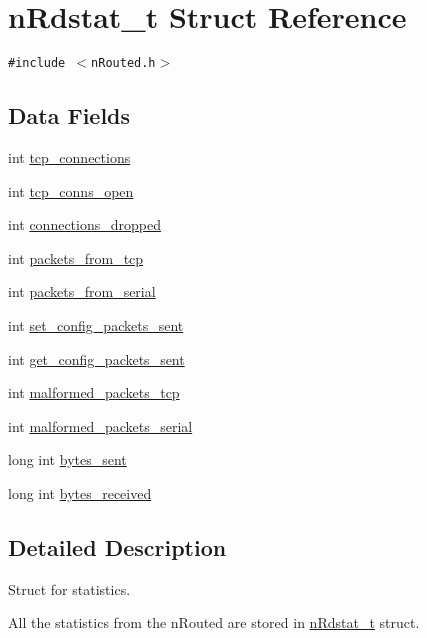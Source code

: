 \hypertarget{structnRdstat__t}{
\section{n\-Rdstat\_\-t Struct Reference}
\label{structnRdstat__t}
}
{\tt \#include $<$n\-Routed.h$>$}

\subsection*{Data Fields}
\begin{CompactItemize}
\item 
int \hyperlink{structnRdstat__t_afc21d80b9ea15c65cff7b4cec7973e5}{tcp\_\-connections}
\item 
int \hyperlink{structnRdstat__t_564faff52a7149d351488516cffbfc35}{tcp\_\-conns\_\-open}
\item 
int \hyperlink{structnRdstat__t_7e77d4adf8d902e944de8ed14bc4691e}{connections\_\-dropped}
\item 
int \hyperlink{structnRdstat__t_346e4fe879447dbe64689e46401d07d1}{packets\_\-from\_\-tcp}
\item 
int \hyperlink{structnRdstat__t_dfc822591f9e821e6835fc009158b187}{packets\_\-from\_\-serial}
\item 
int \hyperlink{structnRdstat__t_aee0b8cec83aff779e9b6a0062ba6677}{set\_\-config\_\-packets\_\-sent}
\item 
int \hyperlink{structnRdstat__t_fa233a9c22104e9ef722143968f18d32}{get\_\-config\_\-packets\_\-sent}
\item 
int \hyperlink{structnRdstat__t_518d1b1a04c73f328e18e8dfec9691a7}{malformed\_\-packets\_\-tcp}
\item 
int \hyperlink{structnRdstat__t_ea478ea425e07a7511bb8dc909c049ca}{malformed\_\-packets\_\-serial}
\item 
long int \hyperlink{structnRdstat__t_1b3082b4f7c51e187c43ef4964cf5bb3}{bytes\_\-sent}
\item 
long int \hyperlink{structnRdstat__t_2b421bcc473a30ddf8044bd26482e07d}{bytes\_\-received}
\end{CompactItemize}


\subsection{Detailed Description}
Struct for statistics.

All the statistics from the n\-Routed are stored in \hyperlink{structnRdstat__t}{n\-Rdstat\_\-t} struct.

